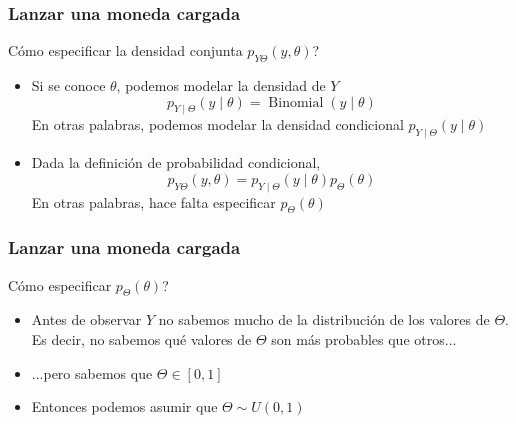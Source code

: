 \documentclass[xcolor=dvipsnames,10pt]{beamer}
\begin{document}
%
%
\begin{frame}
  \frametitle{Lanzar una moneda cargada}
  Cómo especificar la densidad conjunta $p_{Y \Theta}(y, \theta)$?
  \begin{itemize}
  \item Si se conoce $\theta$, podemos modelar la densidad de $Y$
    \begin{equation*}
      p_{Y \mid \Theta}(y \mid \theta) = \operatorname{Binomial}(y \mid \theta)
    \end{equation*}
    En otras palabras, podemos modelar la densidad condicional $p_{Y \mid \Theta}(y \mid \theta)$
    \pause
  \item Dada la definición de probabilidad condicional,
    \begin{equation*}
      p_{Y \Theta}(y, \theta) = p_{Y \mid \Theta}(y \mid \theta) p_\Theta(\theta)
    \end{equation*}
    En otras palabras, hace falta especificar $p_{\Theta}(\theta)$
    \pause
  \end{itemize}
\end{frame}
%
\begin{frame}
  \frametitle{Lanzar una moneda cargada}
  Cómo especificar $p_{\Theta}(\theta)$?
  \begin{itemize}
  \item Antes de observar $Y$ no sabemos mucho de la distribución de los valores de $\Theta$.
    Es decir, no sabemos qué valores de $\Theta$ son más probables que otros...
  \item ...pero sabemos que $\Theta \in [0, 1]$
    \pause
  \item Entonces podemos asumir que $\Theta \sim U(0, 1)$
  \end{itemize}

\end{frame}
\end{document}

